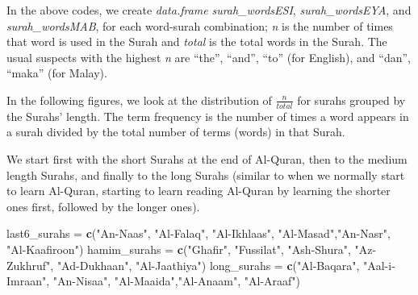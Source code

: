 \documentclass[
]{article}
\newenvironment{Shaded}{\begin{snugshade}}{\end{snugshade}}
\newcommand{\FunctionTok}[1]{\textcolor[rgb]{0.13,0.29,0.53}{\textbf{#1}}}
\newcommand{\NormalTok}[1]{#1}
\newcommand{\OtherTok}[1]{\textcolor[rgb]{0.56,0.35,0.01}{#1}}
\newcommand{\StringTok}[1]{\textcolor[rgb]{0.31,0.60,0.02}{#1}}
\begin{document}
In the above codes, we create \emph{data.frame} \emph{surah\_wordsESI}, \emph{surah\_wordsEYA}, and \emph{surah\_wordsMAB}, for each word-surah combination; \emph{n} is the number of times that word is used in the Surah and \emph{total} is the total words in the Surah. The usual suspects with the highest \emph{n} are ``the'', ``and'', ``to'' (for English), and ``dan'', ``maka'' (for Malay).

In the following figures, we look at the distribution of \(\frac{n}{total}\) for surahs grouped by the Surahs' length. The term frequency is the number of times a word appears in a surah divided by the total number of terms (words) in that Surah.

We start first with the short Surahs at the end of Al-Quran, then to the medium length Surahs, and finally to the long Surahs (similar to when we normally start to learn Al-Quran, starting to learn reading Al-Quran by learning the shorter ones first, followed by the longer ones).

\footnotesize

\begin{Shaded}
\begin{Highlighting}[]
\NormalTok{last6\_surahs }\OtherTok{=} \FunctionTok{c}\NormalTok{(}\StringTok{"An{-}Naas"}\NormalTok{, }\StringTok{"Al{-}Falaq"}\NormalTok{, }\StringTok{"Al{-}Ikhlaas"}\NormalTok{, }\StringTok{"Al{-}Masad"}\NormalTok{,}\StringTok{"An{-}Nasr"}\NormalTok{, }\StringTok{"Al{-}Kaafiroon"}\NormalTok{)}
\NormalTok{hamim\_surahs }\OtherTok{=} \FunctionTok{c}\NormalTok{(}\StringTok{"Ghafir"}\NormalTok{, }\StringTok{"Fussilat"}\NormalTok{, }\StringTok{"Ash{-}Shura"}\NormalTok{, }\StringTok{"Az{-}Zukhruf"}\NormalTok{, }\StringTok{"Ad{-}Dukhaan"}\NormalTok{, }\StringTok{"Al{-}Jaathiya"}\NormalTok{)}
\NormalTok{long\_surahs }\OtherTok{=} \FunctionTok{c}\NormalTok{(}\StringTok{"Al{-}Baqara"}\NormalTok{, }\StringTok{"Aal{-}i{-}Imraan"}\NormalTok{, }\StringTok{"An{-}Nisaa"}\NormalTok{, }\StringTok{"Al{-}Maaida"}\NormalTok{,}\StringTok{"Al{-}An\textquotesingle{}aam"}\NormalTok{, }\StringTok{"Al{-}A\textquotesingle{}raaf"}\NormalTok{)}
\end{Highlighting}
\end{Shaded}

\normalsize
\end{document}
